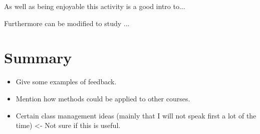 \documentclass{article}
\begin{document}
As well as being enjoyable this activity is a good intro to...

Furthermore can be modified to study ...

\section{Summary}

\begin{itemize}
    \item Give some examples of feedback.
    \item Mention how methods could be applied to other courses.
    \item Certain class management ideas (mainly that I will not speak first a
        lot of the time) <- Not sure if this is useful.
\end{itemize}

\printbibliography
\end{document}
